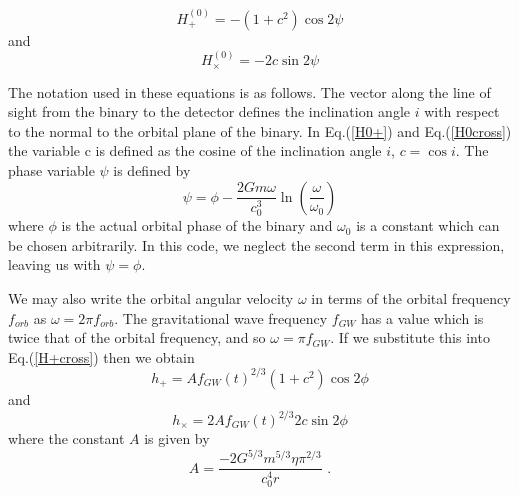 \documentclass[12pt]{article}
\begin{document}
\begin{equation}
H^{(0)}_{+} = -(1+c^{2}) \cos 2\psi
\label{H0+}
\end{equation}
and
\begin{equation}
H^{(0)}_{\times} = -2c \sin 2 \psi
\label{H0cross}
\end{equation}

The notation used in these equations is as follows. The vector along the line of sight from the binary to the detector defines the inclination angle $i$ with respect to the normal to the orbital plane of the binary. In Eq.(\ref{H0+}) and Eq.(\ref{H0cross}) the variable c is defined as the cosine of the inclination angle $i$, $c=\cos i$. The phase variable $\psi$ is defined by
\begin{equation}
\psi = \phi - \frac{2Gm \omega}{c^{3}_{0}} \ln \left( \frac{\omega}{\omega_{0}} \right)
\end{equation}
where $\phi$ is the actual orbital phase of the binary and $\omega_{0}$ is a constant which can be chosen arbitrarily. In this code, we neglect the second term in this expression, leaving us with $\psi=\phi$.

We may also write the orbital angular velocity $\omega$ in terms of the orbital frequency $f_{orb}$ as $\omega=2 \pi f_{orb}$. The gravitational wave frequency $f_{GW}$ has a value which is twice that of the orbital frequency, and so $\omega= \pi f_{GW}$. If we substitute this into Eq.(\ref{H+cross}) then we obtain
\begin{equation}
h_{+} = A f_{GW}(t)^{2/3} (1+c^{2}) \cos 2\phi
\label{hplus}
\end{equation}
and
\begin{equation}
h_{\times} =  2A f_{GW}(t)^{2/3} 2c \sin 2 \phi
\label{htimes}
\end{equation}
where the constant $A$ is given by
\begin{equation}
A = \frac{- 2G^{5/3}m^{5/3} \eta \pi^{2/3}}{c^{4}_{0} r} \,\,.
\end{equation}
\end{document}

